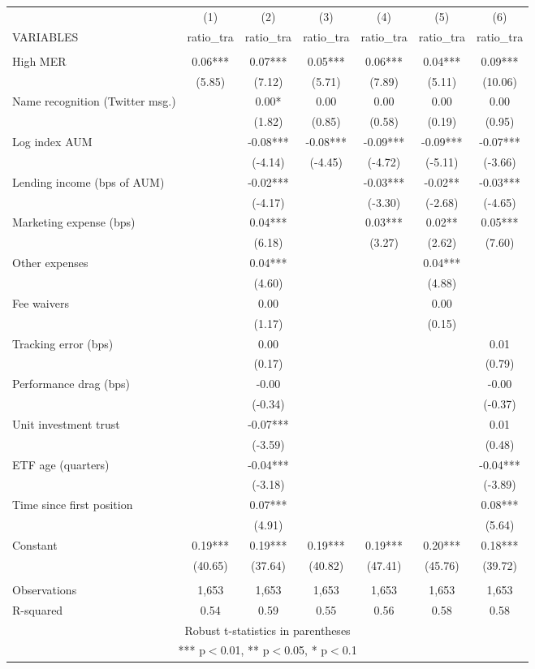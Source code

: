 \documentclass[]{article}
\begin{document}
\begin{tabular}{lcccccc} \hline
 & (1) & (2) & (3) & (4) & (5) & (6) \\
VARIABLES & ratio\_tra & ratio\_tra & ratio\_tra & ratio\_tra & ratio\_tra & ratio\_tra \\ \hline
 &  &  &  &  &  &  \\
High MER & 0.06*** & 0.07*** & 0.05*** & 0.06*** & 0.04*** & 0.09*** \\
 & (5.85) & (7.12) & (5.71) & (7.89) & (5.11) & (10.06) \\
Name recognition (Twitter msg.) &  & 0.00* & 0.00 & 0.00 & 0.00 & 0.00 \\
 &  & (1.82) & (0.85) & (0.58) & (0.19) & (0.95) \\
Log index AUM &  & -0.08*** & -0.08*** & -0.09*** & -0.09*** & -0.07*** \\
 &  & (-4.14) & (-4.45) & (-4.72) & (-5.11) & (-3.66) \\
Lending income (bps of AUM) &  & -0.02*** &  & -0.03*** & -0.02** & -0.03*** \\
 &  & (-4.17) &  & (-3.30) & (-2.68) & (-4.65) \\
Marketing expense (bps) &  & 0.04*** &  & 0.03*** & 0.02** & 0.05*** \\
 &  & (6.18) &  & (3.27) & (2.62) & (7.60) \\
Other expenses &  & 0.04*** &  &  & 0.04*** &  \\
 &  & (4.60) &  &  & (4.88) &  \\
Fee waivers &  & 0.00 &  &  & 0.00 &  \\
 &  & (1.17) &  &  & (0.15) &  \\
Tracking error (bps) &  & 0.00 &  &  &  & 0.01 \\
 &  & (0.17) &  &  &  & (0.79) \\
Performance drag (bps) &  & -0.00 &  &  &  & -0.00 \\
 &  & (-0.34) &  &  &  & (-0.37) \\
Unit investment trust &  & -0.07*** &  &  &  & 0.01 \\
 &  & (-3.59) &  &  &  & (0.48) \\
ETF age (quarters) &  & -0.04*** &  &  &  & -0.04*** \\
 &  & (-3.18) &  &  &  & (-3.89) \\
Time since first position &  & 0.07*** &  &  &  & 0.08*** \\
 &  & (4.91) &  &  &  & (5.64) \\
Constant & 0.19*** & 0.19*** & 0.19*** & 0.19*** & 0.20*** & 0.18*** \\
 & (40.65) & (37.64) & (40.82) & (47.41) & (45.76) & (39.72) \\
 &  &  &  &  &  &  \\
Observations & 1,653 & 1,653 & 1,653 & 1,653 & 1,653 & 1,653 \\
 R-squared & 0.54 & 0.59 & 0.55 & 0.56 & 0.58 & 0.58 \\ \hline
\multicolumn{7}{c}{ Robust t-statistics in parentheses} \\
\multicolumn{7}{c}{ *** p$<$0.01, ** p$<$0.05, * p$<$0.1} \\
\end{tabular}
\end{document}
